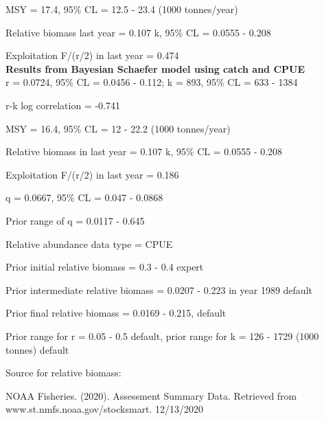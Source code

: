 \documentclass[12pt,a4paper]{article}\usepackage[]{graphicx}\usepackage[]{xcolor}
\begin{document}
MSY = 17.4, 95\% CL = 12.5 - 23.4 (1000 tonnes/year)

Relative biomass last year = 0.107 k, 95\% CL = 0.0555 - 0.208

Exploitation F/(r/2) in last year = 0.474 \\

\textbf{Results from Bayesian Schaefer model using catch and CPUE}\\

r = 0.0724, 95\% CL = 0.0456 - 0.112; k = 893, 95\% CL = 633 - 1384

r-k log correlation = -0.741

MSY = 16.4, 95\% CL = 12 - 22.2 (1000 tonnes/year)

Relative biomass in last year = 0.107 k, 95\% CL = 0.0555 - 0.208

Exploitation F/(r/2) in last year = 0.186

q = 0.0667, 95\% CL = 0.047 - 0.0868

Prior range of q = 0.0117 - 0.645

Relative abundance data type = CPUE

Prior initial relative biomass = 0.3 - 0.4 expert

Prior intermediate relative biomass = 0.0207 - 0.223 in year 1989 default

Prior final relative biomass = 0.0169 - 0.215, default

Prior range for r = 0.05 - 0.5 default, prior range for k = 126 - 1729 (1000 tonnes) default

Source for relative biomass: 

NOAA Fisheries. (2020). Assessment Summary Data. Retrieved from www.st.nmfs.noaa.gov/stocksmart. 12/13/2020

    
\end{document}
